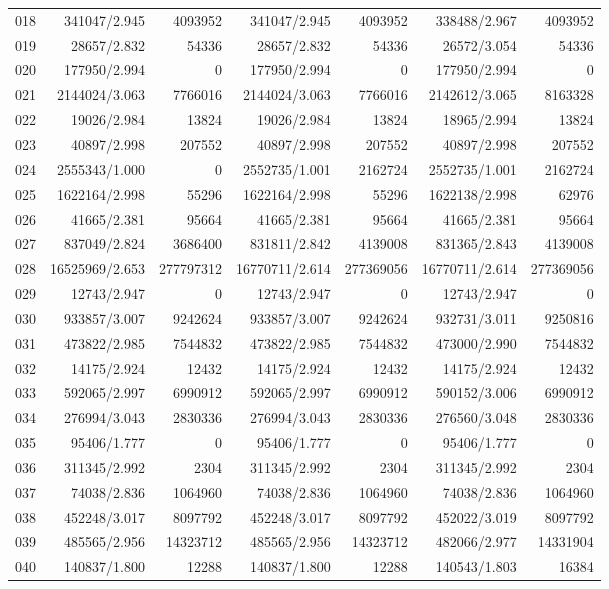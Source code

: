 \begin{longtable}{crrrrrr}
018 & 341047/2.945 & 4093952 & 341047/2.945 & 4093952 & 338488/2.967 & 4093952 \\
019 & 28657/2.832 & 54336 & 28657/2.832 & 54336 & 26572/3.054 & 54336 \\
020 & 177950/2.994 & 0 & 177950/2.994 & 0 & 177950/2.994 & 0 \\
021 & 2144024/3.063 & 7766016 & 2144024/3.063 & 7766016 & 2142612/3.065 & 8163328 \\
022 & 19026/2.984 & 13824 & 19026/2.984 & 13824 & 18965/2.994 & 13824 \\
023 & 40897/2.998 & 207552 & 40897/2.998 & 207552 & 40897/2.998 & 207552 \\
024 & 2555343/1.000 & 0 & 2552735/1.001 & 2162724 & 2552735/1.001 & 2162724 \\
025 & 1622164/2.998 & 55296 & 1622164/2.998 & 55296 & 1622138/2.998 & 62976 \\
026 & 41665/2.381 & 95664 & 41665/2.381 & 95664 & 41665/2.381 & 95664 \\
027 & 837049/2.824 & 3686400 & 831811/2.842 & 4139008 & 831365/2.843 & 4139008 \\
028 & 16525969/2.653 & 277797312 & 16770711/2.614 & 277369056 & 16770711/2.614 & 277369056 \\
029 & 12743/2.947 & 0 & 12743/2.947 & 0 & 12743/2.947 & 0 \\
030 & 933857/3.007 & 9242624 & 933857/3.007 & 9242624 & 932731/3.011 & 9250816 \\
031 & 473822/2.985 & 7544832 & 473822/2.985 & 7544832 & 473000/2.990 & 7544832 \\
032 & 14175/2.924 & 12432 & 14175/2.924 & 12432 & 14175/2.924 & 12432 \\
033 & 592065/2.997 & 6990912 & 592065/2.997 & 6990912 & 590152/3.006 & 6990912 \\
034 & 276994/3.043 & 2830336 & 276994/3.043 & 2830336 & 276560/3.048 & 2830336 \\
035 & 95406/1.777 & 0 & 95406/1.777 & 0 & 95406/1.777 & 0 \\
036 & 311345/2.992 & 2304 & 311345/2.992 & 2304 & 311345/2.992 & 2304 \\
037 & 74038/2.836 & 1064960 & 74038/2.836 & 1064960 & 74038/2.836 & 1064960 \\
038 & 452248/3.017 & 8097792 & 452248/3.017 & 8097792 & 452022/3.019 & 8097792 \\
039 & 485565/2.956 & 14323712 & 485565/2.956 & 14323712 & 482066/2.977 & 14331904 \\
040 & 140837/1.800 & 12288 & 140837/1.800 & 12288 & 140543/1.803 & 16384 \\

\end{longtable}

